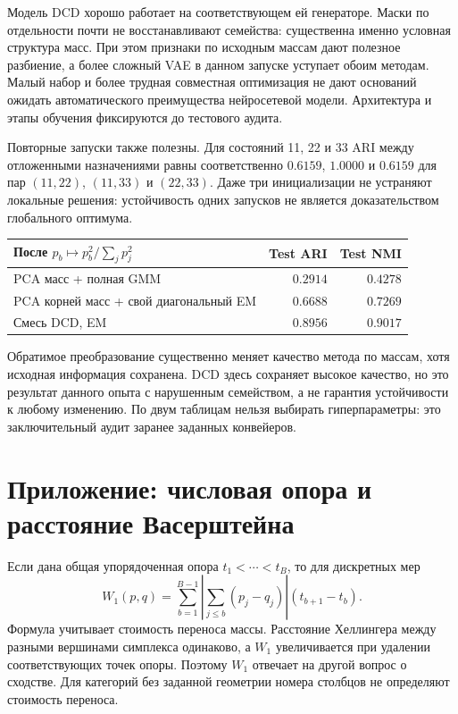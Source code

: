 \documentclass[11pt,a4paper]{article}
\begin{document}
Модель DCD хорошо работает на соответствующем ей генераторе.
Маски по отдельности почти не восстанавливают семейства: существенна
именно условная структура масс. При этом признаки по исходным массам
дают полезное разбиение, а более сложный VAE в данном запуске уступает
обоим методам. Малый набор и более трудная совместная оптимизация
не дают оснований ожидать автоматического преимущества нейросетевой модели.
Архитектура и этапы обучения фиксируются до тестового аудита.

Повторные запуски также полезны. Для состояний 11, 22 и 33 ARI между
отложенными назначениями равны соответственно $0.6159$, $1.0000$ и
$0.6159$ для пар $(11,22)$, $(11,33)$ и $(22,33)$.
Даже три инициализации не устраняют локальные решения: устойчивость
одних запусков не является доказательством глобального оптимума.

\begin{center}
\begin{tabular}{lrr}
\toprule
После $p_b\mapsto p_b^2/\sum_jp_j^2$ & Test ARI & Test NMI\\
\midrule
PCA масс + полная GMM & $0.2914$ & $0.4278$\\
PCA корней масс + свой диагональный EM & $0.6688$ & $0.7269$\\
Смесь DCD, EM & $0.8956$ & $0.9017$\\
\bottomrule
\end{tabular}
\end{center}

Обратимое преобразование существенно меняет качество метода по массам,
хотя исходная информация сохранена. DCD здесь сохраняет высокое качество,
но это результат данного опыта с нарушенным семейством, а не гарантия
устойчивости к любому изменению. По двум таблицам нельзя выбирать
гиперпараметры: это заключительный аудит заранее заданных конвейеров.
\FloatBarrier

\section{Приложение: числовая опора и расстояние Васерштейна}

Если дана общая упорядоченная опора $t_1<\cdots<t_B$, то для дискретных мер
\[
 W_1(p,q)=\sum_{b=1}^{B-1}
 \left|\sum_{j\leq b}(p_j-q_j)\right|(t_{b+1}-t_b).
\]
Формула учитывает стоимость переноса массы. Расстояние Хеллингера между
разными вершинами симплекса одинаково, а $W_1$ увеличивается при удалении
соответствующих точек опоры. Поэтому $W_1$ отвечает на другой вопрос
о сходстве. Для категорий без заданной геометрии номера столбцов
не определяют стоимость переноса.
\end{document}
